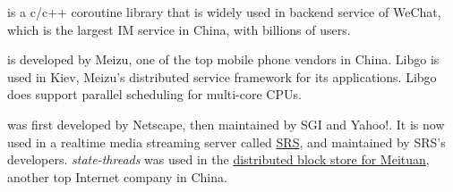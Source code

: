 \cite{libco} is a c/c++ coroutine library that
is widely used in backend service of WeChat, which is the largest IM service
in China, with billions of users. 

\uabschnitt{\libgo}\cite{libgo} is developed by Meizu, one of the top mobile
phone vendors in China. Libgo is used in Kiev, Meizu's distributed service
framework for its applications. Libgo does support parallel scheduling
for multi-core CPUs.

\uabschnitt{\statethreads}\cite{state-threads} was first developed by
Netscape, then maintained by SGI and Yahoo!. It is now used in a realtime
media streaming server called \href{https://github.com/ossrs/srs}{SRS}, and
maintained by SRS's developers. \emph{state-threads} was used in the
\href{https://dl.acm.org/doi/10.1145/3302424.3303967}
{distributed block store for Meituan}, another top Internet company in China.

